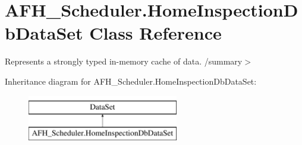 \section{A\+F\+H\+\_\+\+Scheduler.\+Home\+Inspection\+Db\+Data\+Set Class Reference}
\label{class_a_f_h___scheduler_1_1_home_inspection_db_data_set}


Represents a strongly typed in-\/memory cache of data. /summary$>$  


Inheritance diagram for A\+F\+H\+\_\+\+Scheduler.\+Home\+Inspection\+Db\+Data\+Set\+:\begin{figure}[H]
\begin{center}
\leavevmode
\includegraphics[height=2.000000cm]{class_a_f_h___scheduler_1_1_home_inspection_db_data_set}
\end{center}
\end{figure}
